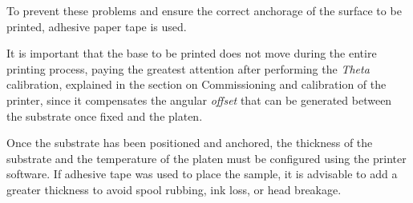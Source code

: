 To prevent these problems and ensure the correct anchorage of the surface to be printed, adhesive paper tape is used.

It is important that the base to be printed does not move during the entire printing process, paying the greatest attention after performing the \textit{Theta} calibration, explained in the section on Commissioning and calibration of the printer, since it compensates the angular \textit{offset} that can be generated between the substrate once fixed and the platen.

Once the substrate has been positioned and anchored, the thickness of the substrate and the temperature of the platen must be configured using the printer software. If adhesive tape was used to place the sample, it is advisable to add a greater thickness to avoid spool rubbing, ink loss, or head breakage.